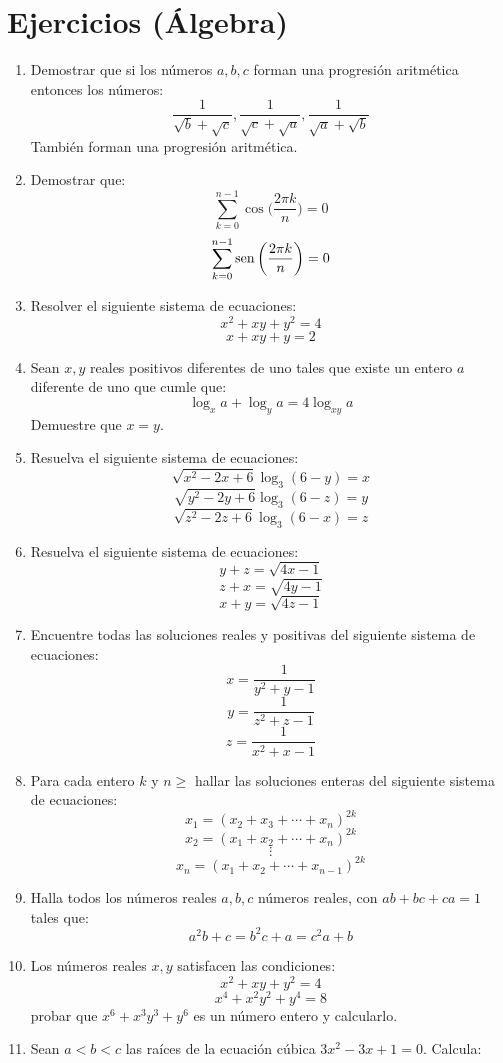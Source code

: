 \documentclass{book}
\newcommand{\sen}{\mathop{\rm sen}\nolimits} %
\begin{document}
\section{Ejercicios (Álgebra)}
\begin{enumerate}
    \item Demostrar que si los números $a,b,c$ forman una progresión aritmética entonces los números:
          $$\frac{1}{\sqrt{b}+\sqrt{c}},\frac{1}{\sqrt{c}+\sqrt{a}},\frac{1}{\sqrt{a}+\sqrt{b}}$$
          También forman una progresión aritmética.
    \item Demostrar que:
          $$ \sum_{k=0}^{n-1}\cos{\bigg(\frac{2\pi k}{n}\bigg)}=0$$
          $$ \sum_{k=0}^{n-1}\sen{\bigg(\frac{2\pi k}{n}\bigg)}=0$$
    \item Resolver el siguiente sistema de ecuaciones:
          $$x^2+xy+y^2=4$$
          $$x+xy+y=2$$
    \item Sean $x,y$ reales positivos diferentes de uno tales que existe un entero $a$ diferente de uno que cumle que:
          $$\log_{x}a+\log_{y}a=4\log_{xy}a$$
          Demuestre que $x=y$.
    \item Resuelva el siguiente sistema de ecuaciones:
          $$\sqrt{x^2-2x+6}\log_{3}{(6-y)}=x$$
          $$\sqrt{y^2-2y+6}\log_{3}{(6-z)}=y$$
          $$\sqrt{z^2-2z+6}\log_{3}{(6-x)}=z$$
    \item Resuelva el siguiente sistema de ecuaciones:
          $$y+z=\sqrt{4x-1}$$
          $$z+x=\sqrt{4y-1}$$
          $$x+y=\sqrt{4z-1}$$
    \item Encuentre todas las soluciones reales y positivas del siguiente sistema de ecuaciones:
          $$x=\frac{1}{y^2+y-1}$$
          $$y=\frac{1}{z^2+z-1}$$
          $$z=\frac{1}{x^2+x-1}$$
    \item Para cada entero $k$ y $n\geq$  hallar las soluciones enteras del siguiente sistema de ecuaciones:
          $$x_1={(x_2+x_3+\cdots+x_n)}^{2k}$$
          $$x_2={(x_1+x_2+\cdots+x_n)}^{2k}$$
          $$\vdots$$
          $$x_n={(x_1+x_2+\cdots+x_{n-1})}^{2k}$$
    \item Halla todos los números reales $a,b,c$ números reales, con $ab+bc+ca=1$ tales que:
          $$a^2b+c=b^2c+a=c^2a+b$$
    \item Los números reales $x,y$ satisfacen las condiciones:
          $$x^2+xy+y^2=4$$
          $$x^4+x^2y^2+y^4=8$$
          probar que $x^6 + x^3y^3 + y^6$ es un número entero y calcularlo.
    \item Sean $a < b < c$ las raíces de la ecuación cúbica $3x^2-3x+1=0$. Calcula:

\end{enumerate}
\end{document}
